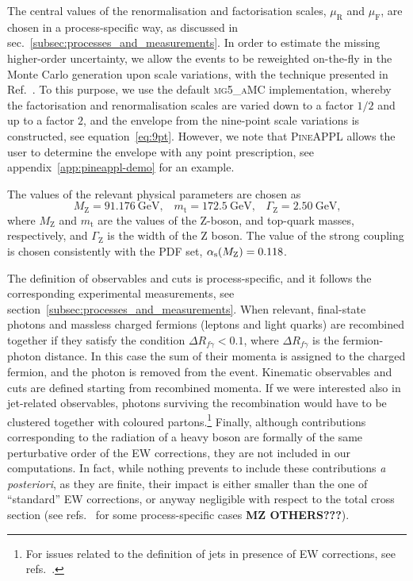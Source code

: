 The central values of the renormalisation and factorisation scales, $\mu_\mathrm{R}$ and
$\mu_\mathrm{F}$, are chosen in a process-specific way, as discussed in sec.~\ref{subsec:processes_and_measurements}. In order to estimate the missing higher-order uncertainty,
we allow the events to be reweighted on-the-fly in the Monte Carlo generation upon scale
variations, with the technique presented in Ref.~\cite{Frederix:2011ss}. To this purpose, we use the default \textsc{mg5\_aMC}
implementation, whereby the factorisation and renormalisation scales
are varied down to a factor $1/2$ and up to a factor $2$, and the envelope
from the nine-point scale variations is constructed,
see equation~\eqref{eq:9pt}. However, we note that
\textsc{PineAPPL} allows the user to determine the envelope with any point
prescription, see appendix~\ref{app:pineappl-demo} for an example.

The values of the relevant physical parameters are chosen as
\begin{equation}
M_\mathrm{Z} = \SI{91.176}{\giga\electronvolt} \text{,} \quad 
m_\mathrm{t} = \SI{172.5}{\giga\electronvolt} \text{,} \quad 
\Gamma_\mathrm{Z} = \SI{2.50}{\giga\electronvolt} \text{,}
\label{eq:parameters}
\end{equation}
where $M_\mathrm{Z}$ and $m_\mathrm{t}$ are the values of the Z-boson, and
top-quark masses, respectively, and $\Gamma_\mathrm{Z}$ is the width of
the Z boson. The value of the strong
coupling is chosen consistently with the PDF set, $\alpha_\mathrm{s}(M_\mathrm{Z})=0.118$.

The definition of observables and cuts is process-specific, and it follows the corresponding experimental measurements,
see section~\ref{subsec:processes_and_measurements}.
When relevant, final-state photons and massless charged fermions (leptons and light quarks) are recombined together 
if they satisfy the condition $\Delta R_{f \gamma}<0.1$, where $\Delta R_{f \gamma}$
is the fermion-photon distance. In this case the
sum of their momenta is assigned to the charged fermion, and the photon is removed
from the event. Kinematic observables and cuts are defined starting from recombined momenta. If we were interested also in jet-related observables,
photons surviving the recombination would have to be clustered together with coloured
partons.\footnote{For issues related to the definition of jets in presence of EW corrections,
see refs.~\cite{Frederix:2016ost,Denner:2019zfp}.} Finally, although contributions corresponding to the radiation
of a heavy boson are formally of the same perturbative order of the EW corrections, they are not included in our
computations. In fact, while nothing prevents to include these contributions \emph{a posteriori}, as they are finite,
their impact is either smaller than the one of \enquote{standard} EW corrections, or anyway negligible with respect to
the total cross section (see refs.~\cite{Frixione:2014qaa,Frixione:2015zaa,Pagani:2016caq} for some process-specific cases {\bf MZ OTHERS???}).
    

